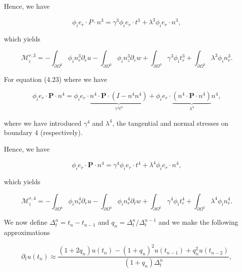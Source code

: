\documentclass{article}
\begin{document}
Hence, we have

\begin{equation}
\phi_i e_r\cdot P\cdot n^3 = \gamma^3 \phi_i e_r\cdot t^3 + \lambda^3 \phi_i e_r\cdot n^3, \tag{4.46}
\end{equation}

which yields

\begin{equation}
\mathcal{M}_i^{r,3} = -\int_{\partial \Omega^{3}} \phi_i n_r^3 \partial_r u - \int_{\partial \Omega^{3}} \phi_i n_z^3 \partial_r w + \int_{\partial \Omega^{3}} \gamma^3 \phi_i t_r^3 + \int_{\partial \Omega^{3}} \lambda^3 \phi_i n_r^3. \tag{4.47}
\end{equation}

For equation (4.23) where we have

\begin{equation}
\phi_i e_r\cdot \pmb {P}\cdot n^{4} = \phi_i e_r\cdot \underbrace{n^{4}\cdot\pmb{P}\cdot(I - n^{4}n^{4})}_{\gamma^{4}t^{4}} + \phi_i e_r\cdot \underbrace{(n^{4}\cdot\pmb{P}\cdot n^{4})}_{\lambda^{4}}n^{4}, \tag{4.49}
\end{equation}

where we have introduced \(\gamma^{4}\) and \(\lambda^{4}\), the tangential and normal stresses on boundary 4 (respectively).

Hence, we have

\begin{equation}
\phi_i e_r\cdot \pmb {P}\cdot n^{4} = \gamma^{4}\phi_i e_r\cdot t^{4} + \lambda^{4}\phi_i e_r\cdot n^{4}, \tag{4.50}
\end{equation}

which yields

\begin{equation}
\mathcal{M}_i^{r,4} = -\int_{\partial \Omega^{4}}\phi_i n_r^{4}\partial_{r}u - \int_{\partial \Omega^{4}}\phi_i n_r^{4}\partial_{t}w + \int_{\partial \Omega^{5}}\gamma^{4}\phi_i t_{r}^{4} + \int_{\partial \Omega^{5}}\lambda^{4}\phi_i n_{r}^{4}. \tag{4.51}
\end{equation}

We now define \(\Delta_t^n = t_n - t_{n-1}\) and \(q_n = \Delta_t^n / \Delta_t^{n-1}\) and we make the following approximations

\begin{equation}
\partial_t u(t_n) \approx \frac{(1 + 2q_n)u(t_n) - (1 + q_n)^2 u(t_{n-1}) + q_n^2 u(t_{n-2})}{(1 + q_n)\Delta_t^n}, \tag{4.52}
\end{equation}
\end{document}
